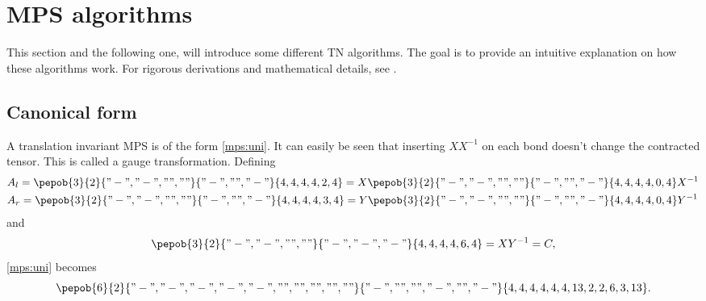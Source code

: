 \section{MPS algorithms}

This section and the following one, will introduce some different \Gls{TN} algorithms. The goal is to provide an intuitive explanation on how these algorithms work. For rigorous derivations and mathematical details, see  \cite{Vanderstraeten2019} .

\subsection{Canonical form}

A translation invariant \Gls{MPS} is of the form \cref{mps:uni}. It can easily be seen that inserting $X X^{-1}$ on each bond doesn't change the contracted tensor. This is called a gauge transformation. Defining
\begin{equation}
    \begin{split}
        &A_l = \pepob{3}{2}{{
                    "-","-",
                    "",""}}{{
                    "-",
                    "",
                    "-"}}{{
                    4,4,4,
                    4,2,4}}  =X \pepob{3}{2}{{
                    "-","-",
                    "",""}}{{
                    "-",
                    "",
                    "-"}}{{
                    4,4,4,
                    4,0,4}} X^{-1} \\
        &A_r = \pepob{3}{2}{{
                    "-","-",
                    "",""}}{{
                    "-",
                    "",
                    "-"}}{{
                    4,4,4,
                    4,3,4}}=Y \pepob{3}{2}{{
                    "-","-",
                    "",""}}{{
                    "-",
                    "",
                    "-"}}{{
                    4,4,4,
                    4,0,4}} Y^{-1}
    \end{split}
\end{equation}
and
\begin{equation}
    \pepob{3}{2}{{
                "-","-",
                "",""}}{{
                "-",
                "-",
                "-"}}{{
                4,4,4,
                4,6,4}}  = X Y^{-1} = C ,
\end{equation}
\cref{mps:uni}  becomes
\begin{equation}
    \pepob{6}{2}{{
                "-","-", "-","-","-",
                "","","","",""}}{{
                "-",
                "",
                "",
                "-",
                "",
                "-"}}{{
                4,4,4,4,4,4,
                13,2,2,6,3,13}} .
\end{equation}
